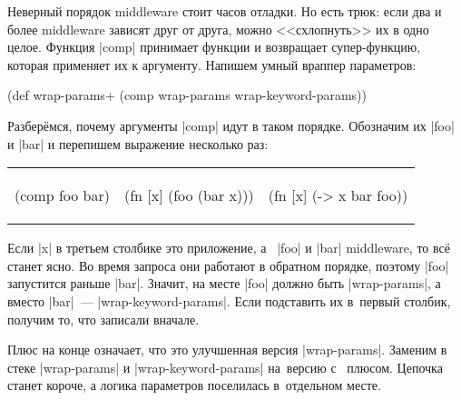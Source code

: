 Неверный порядок middleware стоит часов отладки. Но есть трюк: если два и более
middleware зависят друг от друга, можно <<схлопнуть>> их в одно целое. Функция
\spverb|comp| принимает функции и возвращает супер-функцию, которая
применяет их к аргументу. Напишем умный враппер параметров:

\begin{english}
  \begin{clojure}
(def wrap-params+ (comp wrap-params wrap-keyword-params))
  \end{clojure}
\end{english}

Разбер\"{е}мся, почему аргументы \spverb|comp| идут в таком порядке. Обозначим их
\spverb|foo| и \spverb|bar| и перепишем выражение несколько раз:

\noindent
\begin{tabular}{ @{}p{3.2cm} @{}p{3.5cm} @{}p{3.5cm} }

\begin{english}
  \begin{clojure}
(comp foo bar)
  \end{clojure}
\end{english}

&

\begin{english}
  \begin{clojure}
(fn [x]
  (foo (bar x)))
  \end{clojure}
\end{english}

&

\begin{english}
  \begin{clojure}
(fn [x] (-> x
            bar
            foo))
  \end{clojure}
\end{english}

\end{tabular}

Если \spverb|x| в третьем столбике это приложение, а~ \spverb|foo| и
\spverb|bar| middleware, то вс\"{е} станет ясно. Во время запроса они работают в
обратном порядке, поэтому \spverb|foo| запустится раньше \spverb|bar|. Значит,
на месте \spverb|foo| должно быть \spverb|wrap-params|, а вместо
\spverb|bar|~--- \spverb|wrap-keyword-params|. Если подставить их в~первый
столбик, получим то, что записали вначале.

Плюс на конце означает, что это улучшенная версия \spverb|wrap-params|. Заменим
в стеке \spverb|wrap-params| и \spverb|wrap-keyword-params| на~версию с~
плюсом. Цепочка станет короче, а логика параметров поселилась в~отдельном месте.

